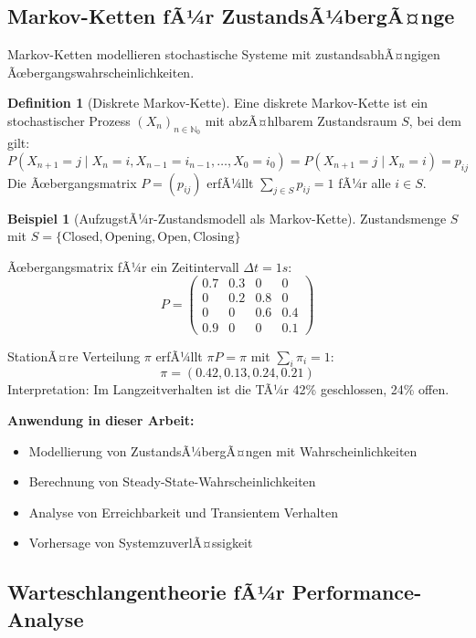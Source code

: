 ﻿\documentclass[a4paper,12pt]{scrreprt}
\theoremstyle{definition}
\newtheorem{definition}{Definition}[section]
\newtheorem{beispiel}{Beispiel}[section]
\begin{document}
\subsection{Markov-Ketten fÃ¼r ZustandsÃ¼bergÃ¤nge}

Markov-Ketten \cite{stewart1994} modellieren stochastische Systeme mit zustandsabhÃ¤ngigen Ãœbergangs\-wahrscheinlichkeiten.

\begin{definition}[Diskrete Markov-Kette]
	Eine diskrete Markov-Kette ist ein stochastischer Prozess $(X_n)_{n \in \mathbb{N}_0}$ mit abzÃ¤hlbarem Zustandsraum $S$, bei dem gilt:
	\[
	P(X_{n+1} = j \mid X_n = i, X_{n-1} = i_{n-1}, \ldots, X_0 = i_0) = P(X_{n+1} = j \mid X_n = i) = p_{ij}
	\]
	Die Ãœbergangsmatrix $P = (p_{ij})$ erfÃ¼llt $\sum_{j \in S} p_{ij} = 1$ fÃ¼r alle $i \in S$.
\end{definition}

\begin{beispiel}[AufzugstÃ¼r-Zustandsmodell als Markov-Kette]
	Zustandsmenge $S$ mit $S = \{\text{Closed}, \text{Opening}, \text{Open}, \text{Closing}\}$
	
	Ãœbergangsmatrix fÃ¼r ein Zeitintervall $\Delta t = 1s$:
	\[
	P = \begin{pmatrix}
		0.7 & 0.3 & 0 & 0 \\
		0 & 0.2 & 0.8 & 0 \\
		0 & 0 & 0.6 & 0.4 \\
		0.9 & 0 & 0 & 0.1
	\end{pmatrix}
	\]
	
	StationÃ¤re Verteilung $\pi$ erfÃ¼llt $\pi P = \pi$ mit $\sum_i \pi_i = 1$:
	\[
	\pi = (0.42, 0.13, 0.24, 0.21)
	\]
	Interpretation: Im Langzeitverhalten ist die TÃ¼r 42\% geschlossen, 24\% offen.
\end{beispiel}

\textbf{Anwendung in dieser Arbeit:}
\begin{itemize}
	\item[-] Modellierung von ZustandsÃ¼bergÃ¤ngen mit Wahrscheinlichkeiten
	\item[-] Berechnung von Steady-State-Wahrscheinlichkeiten
	\item[-] Analyse von Erreichbarkeit und Transientem Verhalten
	\item[-] Vorhersage von SystemzuverlÃ¤ssigkeit
\end{itemize}

\subsection{Warteschlangentheorie fÃ¼r Performance-Analyse}
\end{document}
